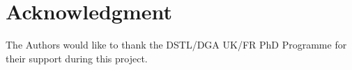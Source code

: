 \documentclass[conference]{IEEEtran}
\begin{document}
%






\section*{Acknowledgment}

 The Authors would like to thank the DSTL/DGA UK/FR PhD Programme for their support during this project.



\end{document}
